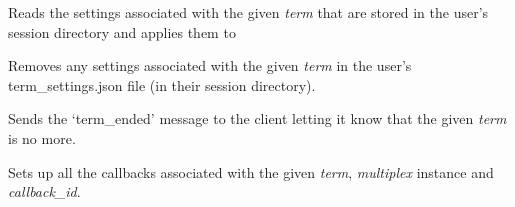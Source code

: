 \documentclass[letterpaper,10pt,openany]{sphinxmanual}
\begin{document}
\begin{fulllineitems}
\begin{fulllineitems}
\end{fulllineitems}


\begin{fulllineitems}
\label{Applications/terminal/app_terminal:app_terminal.TerminalApplication.restore_term_settings}
Reads the settings associated with the given \emph{term} that are stored in
the user's session directory and applies them to

\end{fulllineitems}


\begin{fulllineitems}
\label{Applications/terminal/app_terminal:app_terminal.TerminalApplication.clear_term_settings}
Removes any settings associated with the given \emph{term} in the user's
term\_settings.json file (in their session directory).

\end{fulllineitems}


\begin{fulllineitems}
\label{Applications/terminal/app_terminal:app_terminal.TerminalApplication.term_ended}
Sends the `term\_ended' message to the client letting it know that the
given \emph{term} is no more.

\end{fulllineitems}


\begin{fulllineitems}
\label{Applications/terminal/app_terminal:app_terminal.TerminalApplication.add_terminal_callbacks}
Sets up all the callbacks associated with the given \emph{term}, \emph{multiplex}
instance and \emph{callback\_id}.

\end{fulllineitems}


\end{fulllineitems}
\end{document}
